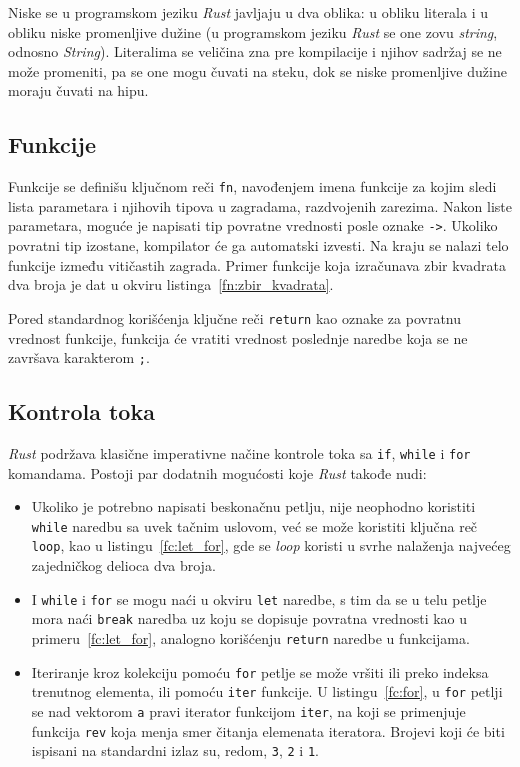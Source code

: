 \documentclass[12pt,oneside]{memoir}
\begin{document}
Niske se u programskom jeziku \emph{Rust} javljaju u dva oblika:
u obliku literala i u obliku niske promenljive dužine
(u programskom jeziku \emph{Rust} se one zovu \emph{string}, odnosno \emph{String}).
Literalima se veličina zna pre kompilacije i njihov sadržaj se ne može promeniti,
pa se one mogu čuvati na steku, dok se niske promenljive dužine moraju čuvati na hipu.

\subsection{Funkcije}
Funkcije se definišu ključnom reči \texttt{fn}, navođenjem imena funkcije za kojim sledi
lista parametara i njihovih tipova u zagradama, razdvojenih zarezima. Nakon liste parametara,
moguće je napisati tip povratne vrednosti posle oznake \texttt{->}. Ukoliko povratni tip izostane,
kompilator će ga automatski izvesti. Na kraju se nalazi telo funkcije između vitičastih zagrada.
Primer funkcije koja izračunava zbir kvadrata dva broja je dat u okviru listinga~\ref{fn:zbir_kvadrata}.



\noindent
Pored standardnog korišćenja ključne reči \texttt{return} kao oznake za povratnu vrednost funkcije,
funkcija će vratiti vrednost poslednje naredbe koja se ne završava karakterom \texttt{;}.

\subsection{Kontrola toka}
\emph{Rust} podržava klasične imperativne načine kontrole toka sa \texttt{if},
\texttt{while} i \texttt{for} komandama. Postoji par dodatnih mogućosti
koje \emph{Rust} takođe nudi:

\begin{itemize}
  \item Ukoliko je potrebno napisati beskonačnu petlju, nije neophodno koristiti
        \texttt{while} naredbu sa uvek tačnim uslovom, već se može koristiti
        ključna reč \texttt{loop}, kao u listingu~\ref{fc:let_for}, gde se
        \emph{loop} koristi u svrhe nalaženja najvećeg zajedničkog delioca
        dva broja.
  \item I \texttt{while} i \texttt{for} se mogu naći u okviru \texttt{let}
        naredbe, s tim da se u telu petlje mora naći \texttt{break} naredba
        uz koju se dopisuje povratna vrednosti kao u primeru~\ref{fc:let_for},
        analogno korišćenju \texttt{return}
        naredbe u funkcijama.
  \item Iteriranje kroz kolekciju pomoću \texttt{for} petlje se može vršiti ili
        preko indeksa trenutnog elementa, ili pomoću \texttt{iter} funkcije.
        U listingu~\ref{fc:for}, u \texttt{for} petlji se nad
        vektorom \texttt{a} pravi iterator funkcijom \texttt{iter},
        na koji se primenjuje funkcija \texttt{rev} koja
        menja smer čitanja elemenata iteratora. Brojevi
        koji će biti ispisani na standardni izlaz su, redom, \texttt{3},
        \texttt{2} i \texttt{1}.
\end{itemize}
\end{document}
